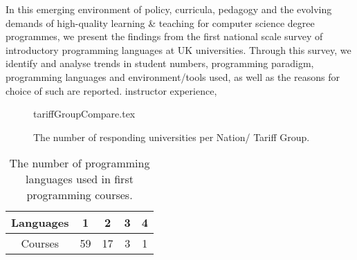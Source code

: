 \documentclass{sig-alternate}
\begin{document}
\iffalse
Alongside this increased scrutiny of standards and outputs for
computer science degrees in UK universities, a Teaching Excellence
Framework\footnote{\url{http://www.hefce.ac.uk/lt/tef/}} has been
proposed as part of proposed new higher education legislation. The
core ambition of the framework is ``to raise the quality and status of
teaching in higher education institutions''; excellence is to be
measured through a series of proxy metrics that include student
satisfaction, retention and graduate employability. There has been
significant concerns about the aims of the framework, as well as the
suitability of the metrics; more so in the context of it benchmarking
and creating leagues tables for ``teaching excellence'', as well as
deciding whether institutions are allowed to raise tuition fees in the
future. The UK's Higher Education Academy -- the national body which
champions teaching quality -- has previously supported initiatives for
improving learning \& teaching in computer science, including
innovative pedagogies for
programming~\cite{crick-et-al-hea:2015,davenport-et-al:latice2016},
but we have not seen the desired cascading of best practice and wider
national impact.
\fi 

In this emerging environment of policy, curricula, pedagogy and the
evolving demands of high-quality learning \& teaching for computer
science degree programmes, we present the findings from the first
national scale survey of introductory programming languages at UK
universities. Through this survey, we identify and analyse trends in
student numbers, programming paradigm, programming languages and
environment/tools used, as well as the reasons for choice of such are
reported. %
instructor experience, %

\begin{figure}
\begin{center}
{tariffGroupCompare.tex}\vskip-12pt
\caption{The number of responding universities per Nation/   
 Tariff Group.\label{fig:TG}}
\end{center}
\end{figure}

\begin{table}[]
\centering
\caption{The number of programming languages used in first programming courses.\label{tab:numLangs}}
\label{tab:numLanguages}
\begin{tabular}{ccccc}
\hline
Languages & 1  & 2  & 3 & 4 \\ \hline
Courses   & 59 & 17 & 3 & 1 \\ \hline
\end{tabular}
\end{table}
\end{document}
